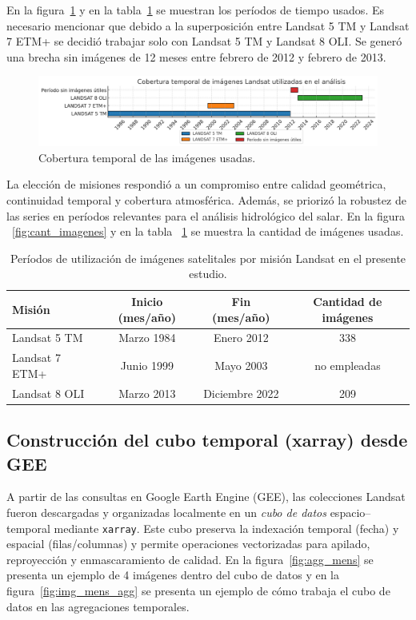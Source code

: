 En la figura~\ref{fig:cob_temporal} y en la tabla~\ref{tab:periodos_landsat} se muestran los períodos de tiempo usados. Es necesario mencionar que debido a la superposición entre Landsat 5 TM y Landsat 7 ETM+ se decidió trabajar solo con Landsat 5 TM y Landsat 8 OLI. Se generó una brecha sin imágenes de 12 meses entre febrero de 2012 y febrero de 2013.

\begin{figure}[ht]
        \centering
        \includegraphics[scale=.4]
        {Figures/fig11.png}
        \caption{Cobertura temporal de las imágenes usadas.}
        \label{fig:cob_temporal}
\end{figure}

La elección de misiones respondió a un compromiso entre calidad geométrica, continuidad temporal y cobertura atmosférica. Además,  se priorizó la robustez de las series en períodos relevantes para el análisis hidrológico del salar. En la figura ~\ref{fig:cant_imagenes} y en la tabla ~\ref{tab:periodos_landsat} se muestra la cantidad de imágenes usadas. 


\begin{table}[h]
	\centering
	\caption[Períodos Landsat]{Períodos de utilización de imágenes satelitales por misión Landsat en el presente estudio.}
	\begin{tabular}{l c c c}    
		\toprule
		\textbf{Misión}     & \textbf{Inicio (mes/año)} & \textbf{Fin (mes/año)} & \textbf{Cantidad de imágenes} \\
		\midrule
		Landsat 5 TM        & Marzo 1984   & Enero 2012        & 338 \\		
		Landsat 7 ETM+      & Junio 1999   & Mayo 2003         & no empleadas \\
		Landsat 8 OLI       & Marzo 2013   & Diciembre 2022    & 209 \\
		\bottomrule
	\end{tabular}
        \hline
	\label{tab:periodos_landsat}
\end{table}

\subsection{Construcción del cubo temporal (xarray) desde GEE}
A partir de las consultas en Google Earth Engine (GEE), las colecciones Landsat fueron descargadas y organizadas localmente en un \emph{cubo de datos} espacio–temporal mediante \texttt{xarray}. Este cubo preserva la indexación temporal (fecha) y espacial (filas/columnas) y permite operaciones vectorizadas para apilado, reproyección y enmascaramiento de calidad. En la figura~\ref{fig:agg_mens} se presenta un ejemplo de 4 imágenes dentro del cubo de datos y en la figura~\ref{fig:img_mens_agg} se presenta un ejemplo de cómo trabaja el cubo de datos en las agregaciones temporales.


